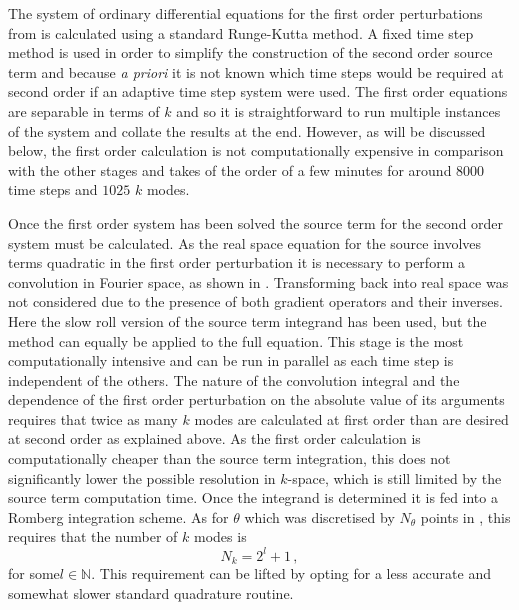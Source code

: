 The system of ordinary differential equations for the first order
perturbations from  is calculated using a standard
Runge-Kutta method. A fixed time step method is used in order to
simplify the construction of the  second order source term and because
\emph{a priori} it is not known which time steps would be required at
second order if an adaptive time step system were used. The first
order equations are separable in terms of $k$ and so it is
straightforward to run multiple instances of the system and collate
the results at the end. However, as will be discussed below, the first
order calculation is not computationally expensive in comparison with
the other stages and takes of the order of a few minutes for around
$8000$ time steps and $1025$ $k$ modes.


Once the first order system has been solved 
the source term for the second order system must be calculated. As the
real space equation for the source involves terms quadratic in the
first order perturbation it is necessary to perform a convolution in
Fourier space, as shown in .  Transforming
back into real space was not considered due to the presence of both
gradient operators and their inverses. Here the slow roll version of
the source term integrand has been used, but the method can equally be
applied to the full equation. This stage is the most computationally
intensive and can be run in parallel as each time step is independent
of the others. The nature of the convolution integral and the
dependence of the first order perturbation on the absolute value of
its arguments requires that twice as many $k$ modes are calculated at
first order than are desired at second order as explained above.  As
the first order calculation is computationally cheaper than the source
term integration, this does not significantly lower the possible
resolution in $k$-space, which is still limited by the source term
computation time.  Once the integrand is determined it is fed into a
Romberg integration scheme. As for $\theta$  which was
discretised by $N_\theta$ points in , this requires that the
number of $k$ modes is
%
\begin{equation}
\label{eq:nk-constraint-num}
N_k=2^l + 1\,,
\end{equation}
%
for some\footnotemark $l\in\mathbb{N}$. 
This requirement can be lifted by opting for a less
accurate and somewhat slower standard quadrature routine.


